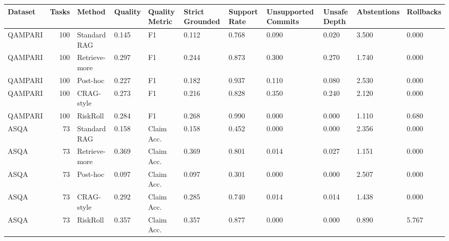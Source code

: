 \begin{tabular}{lrlllllllll}
\toprule
Dataset & Tasks & Method & Quality & Quality Metric & Strict Grounded & Support Rate & Unsupported Commits & Unsafe Depth & Abstentions & Rollbacks \\
\midrule
QAMPARI & 100 & Standard RAG & 0.145 & F1 & 0.112 & 0.768 & 0.090 & 0.020 & 3.500 & 0.000 \\
QAMPARI & 100 & Retrieve-more & 0.297 & F1 & 0.244 & 0.873 & 0.300 & 0.270 & 1.740 & 0.000 \\
QAMPARI & 100 & Post-hoc & 0.227 & F1 & 0.182 & 0.937 & 0.110 & 0.080 & 2.530 & 0.000 \\
QAMPARI & 100 & CRAG-style & 0.273 & F1 & 0.216 & 0.828 & 0.350 & 0.240 & 2.120 & 0.000 \\
QAMPARI & 100 & RiskRoll & 0.284 & F1 & 0.268 & 0.990 & 0.000 & 0.000 & 1.110 & 0.680 \\
ASQA & 73 & Standard RAG & 0.158 & Claim Acc. & 0.158 & 0.452 & 0.000 & 0.000 & 2.356 & 0.000 \\
ASQA & 73 & Retrieve-more & 0.369 & Claim Acc. & 0.369 & 0.801 & 0.014 & 0.027 & 1.151 & 0.000 \\
ASQA & 73 & Post-hoc & 0.097 & Claim Acc. & 0.097 & 0.301 & 0.000 & 0.000 & 2.507 & 0.000 \\
ASQA & 73 & CRAG-style & 0.292 & Claim Acc. & 0.285 & 0.740 & 0.014 & 0.014 & 1.438 & 0.000 \\
ASQA & 73 & RiskRoll & 0.357 & Claim Acc. & 0.357 & 0.877 & 0.000 & 0.000 & 0.890 & 5.767 \\
\bottomrule
\end{tabular}
